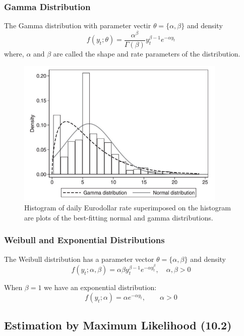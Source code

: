 \documentclass[11pt]{article}
\begin{document}
\subsubsection{Gamma Distribution}

The Gamma distribution with parameter vectir $\theta = \{\alpha,\beta\}$ and density
\begin{equation}
f\left(y_t ; \theta\right)=\frac{\alpha^\beta}{\Gamma(\beta)} y_t^{\beta-1} e^{-\alpha y_t}
\end{equation}
where, $\alpha$ and $\beta$ are called the shape and rate parameters of the distribution.

\begin{figure}[h]
    \centering
    \includegraphics[width=10cm]{pics/gamma vs normal dist.png}
    \caption{Histogram of daily Eurodollar rate superimposed on the histogram are plots of the best-fitting normal and gamma distributions.}
    \label{fig:gamma vs normal}
\end{figure}

\subsubsection{Weibull and Exponential Distributions}

The Weibull distribution has a parameter vector $\theta = \{\alpha,\beta\}$ and density
\begin{equation}
f\left(y_t ; \alpha, \beta\right)=\alpha \beta y_t^{\beta-1} e^{-\alpha y_t^\beta}, \quad \alpha, \beta>0
\end{equation}

When $\beta=1$ we have an exponential distribution:
\[f(y_t;\alpha) = \alpha e^{-\alpha y_t}, \qquad \alpha>0\]

\subsection{Estimation by Maximum Likelihood (10.2)}
\end{document}
